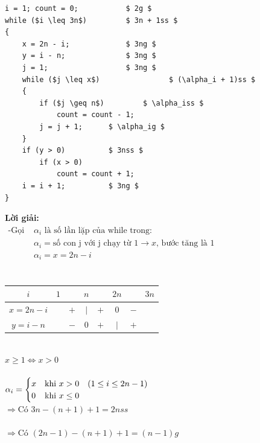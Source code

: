 \documentclass[12pt, letterpaper]{article}
\begin{document}
{{{\begin{lstlisting}
i = 1; count = 0;      		$ 2g $
while ($i \leq 3n$)         $ 3n + 1ss $	
{
    x = 2n - i;        		$ 3ng $
    y = i - n;         		$ 3ng $
    j = 1;             		$ 3ng $
    while ($j \leq x$)        	      $ (\alpha_i + 1)ss $ 
    {
    	if ($j \geq n$)			$ \alpha_iss $
    	    count = count - 1;
        j = j + 1;		$ \alpha_ig $
    }
    if (y > 0)			$ 3nss $
        if (x > 0)
            count = count + 1;
    i = i + 1;			$ 3ng $
}
\end{lstlisting}
\textbf{Lời giải:} \\
$ \begin{aligned}
	\text{-Gọi } & \alpha_i \text{ là số lần lặp của while trong:}                              \\
				& \alpha_i = \text{số con j với j chạy từ 1} \rightarrow x \text{, bước tăng là 1} \\
				& \alpha_i = x = 2n - i \\
\end{aligned} $ \\
 \\
\begin{table}[htb]
    \begin{tabular}{c|c c c c c c c}
        $i$ & $1$ &  & $n$ &  & $2n$ &  & $3n$ \\
        \hline
        $x = 2n - i$ &  & $+$ & $\vert$ & $+$ & $0$ & $-$ & \\
        $y = i - n$ &  & $-$ & $0$ & $+$ & $\vert$ & $+$ &  \\
    \end{tabular}
\end{table} \\
 $x \geq 1 \Leftrightarrow x > 0$ \\ \\
$\alpha_i =
\begin{cases}
x &\text{khi } x>0 \quad (1 \leq i \leq 2n - 1)\\
0 &\text{khi } x\leq 0
\end{cases} \\$
 \\
$\Rightarrow \text{Có } 3n - (n + 1) + 1 = 2nss$ \\
 \\
$\Rightarrow \text{Có } (2n - 1) - (n + 1) + 1 = (n - 1)g$ \\
}}}
\end{document}
